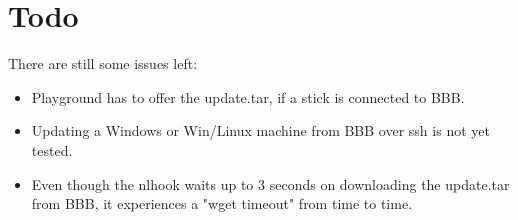 \documentclass[10pt,a4paper]{article}
\begin{document}
\section{Todo}
There are still some issues left:
\begin{itemize}
\item Playground has to offer the update.tar, if a stick is connected to BBB.
\item Updating a Windows or Win/Linux machine from BBB over ssh is not yet tested.
\item Even though the nlhook waits up to 3 seconds on downloading the update.tar from BBB, it experiences a "wget timeout" from time to time.

\end{itemize}
\end{document}
